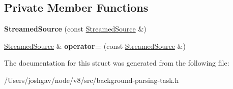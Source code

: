 \subsection*{Private Member Functions}
\begin{DoxyCompactItemize}
\item 
{\bfseries Streamed\+Source} (const \hyperlink{structv8_1_1internal_1_1_streamed_source}{Streamed\+Source} \&)\hypertarget{structv8_1_1internal_1_1_streamed_source_aee465f1fb9427beb8bf83b62cd16b5d4}{}\label{structv8_1_1internal_1_1_streamed_source_aee465f1fb9427beb8bf83b62cd16b5d4}

\item 
\hyperlink{structv8_1_1internal_1_1_streamed_source}{Streamed\+Source} \& {\bfseries operator=} (const \hyperlink{structv8_1_1internal_1_1_streamed_source}{Streamed\+Source} \&)\hypertarget{structv8_1_1internal_1_1_streamed_source_a42a26db5163b1a622a0d181256c129d3}{}\label{structv8_1_1internal_1_1_streamed_source_a42a26db5163b1a622a0d181256c129d3}

\end{DoxyCompactItemize}


The documentation for this struct was generated from the following file\+:\begin{DoxyCompactItemize}
\item 
/\+Users/joshgav/node/v8/src/background-\/parsing-\/task.\+h\end{DoxyCompactItemize}
